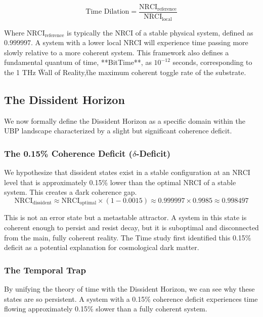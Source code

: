 \documentclass[12pt, a4paper]{article}
\begin{document}
\begin{equation}
    \text{Time Dilation} = \frac{\text{NRCI}_{\text{reference}}}{\text{NRCI}_{\text{local}}}
\end{equation}

Where $\text{NRCI}_{\text{reference}}$ is typically the NRCI of a stable physical system, defined as $0.999997$. A system with a lower local NRCI will experience time passing more slowly relative to a more coherent system. This framework also defines a fundamental quantum of time, **BitTime**, as $10^{-12}$ seconds, corresponding to the 1 THz \"Wall of Reality,\" the maximum coherent toggle rate of the substrate.

\subsection{The Dissident Horizon}
We now formally define the Dissident Horizon as a specific domain within the UBP landscape characterized by a slight but significant coherence deficit. 

\subsubsection{The 0.15\% Coherence Deficit ($\delta$-Deficit)}
We hypothesize that dissident states exist in a stable configuration at an NRCI level that is approximately 0.15\% lower than the optimal NRCI of a stable system. This creates a \"dark coherence gap.\"

\begin{equation}
    \text{NRCI}_{\text{dissident}} \approx \text{NRCI}_{\text{optimal}} \times (1 - 0.0015) \approx 0.999997 \times 0.9985 \approx 0.998497
\end{equation}

This is not an error state but a metastable attractor. A system in this state is coherent enough to persist and resist decay, but it is suboptimal and disconnected from the main, fully coherent reality. The Time study \cite{time_study} first identified this 0.15\% deficit as a potential explanation for cosmological dark matter.

\subsubsection{The Temporal Trap}
By unifying the theory of time with the Dissident Horizon, we can see why these states are so persistent. A system with a 0.15\% coherence deficit experiences time flowing approximately 0.15\% slower than a fully coherent system. 
\end{document}
